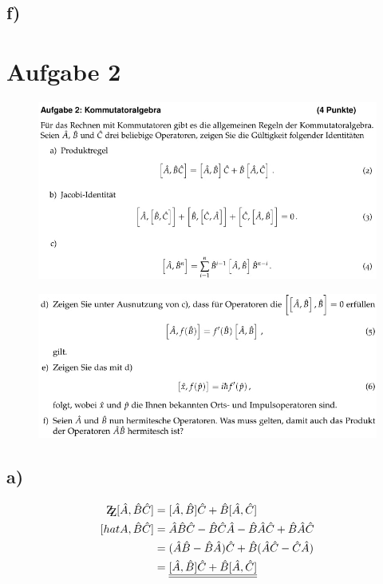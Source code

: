     \subsection{f)}


\section{Aufgabe 2}

    \begin{figure}[H]
        \centering
        \includegraphics[width=\textwidth]{images/Aufgabe2abc.jpg}
        \label{fig:2}
    \end{figure}

    \begin{figure}[H]
        \centering
        \includegraphics[width=\textwidth]{images/Aufgabe2def.jpg}
        \label{fig:3}
    \end{figure}

    \subsection{a)}
    \begin{align}
    \mathrm{Z\kern-.3em\raise-0.5ex\hbox{Z}} [\hat A, \hat B \hat C] &= [\hat A , \hat B]\hat C + \hat B [\hat A , \hat C]\\
    [hat A , \hat B \hat C] &= \hat A \hat B \hat C - \hat B \hat C \hat A -\hat B \hat A \hat C + \hat B \hat A \hat C\\
    &=(\hat A \hat B - \hat B \hat A) \hat C + \hat B (\hat A \hat C -\hat C \hat A)\\
    &=\underline{\underline{[\hat A , \hat B]\hat C + \hat B [\hat A , \hat C]}}
    \end{align}
